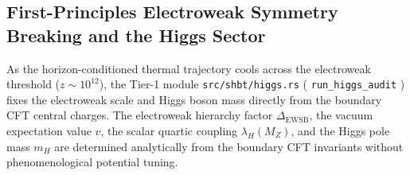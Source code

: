 \documentclass[11pt,letterpaper]{article}
\theoremstyle{plain}
\DeclareRobustCommand{\pyvar}[1]{%
  \ifmmode\text{\nolinkurl{#1}}\else\nolinkurl{#1}\fi%
}
\begin{document}
\begin{table}[htbp]
\centering
\small
{}
\caption{Continuous 5-epoch observer-frame early-universe thermal ladder from the Planck/GUT boundary ($M_{\mathrm{GUT}} = 1.2209\times10^{16}$~GeV) to BBN ($T_{\mathrm{BBN}} = 65.0$~keV). Horizon capacity $N_{\mathrm{local}}(z) = N_{\mathrm{sat}} f_H^2(z)$ scales monotonically with cosmological expansion. The primordial asymmetry $\eta_{B-L}^{\mathrm{prim}} = 1.8198\times10^{-9}$ at $M_N$ locks through the sphaleron conversion factor $C_{\mathrm{sph}} = 28/79$ to the canonical invariant $\eta_B = 6.449923\times10^{-10}$ for all $T \le T_{\mathrm{EW}}$, protected against thermal washout by $\Gamma_{\mathrm{washout}}/H \le 2.877\times10^{-15}$.}
\label{tab:observer-thermal-ladder}
\end{table}


\subsection{First-Principles Electroweak Symmetry Breaking and the Higgs Sector}
\label{sec:first-principles-ewsb-higgs}

As the horizon-conditioned thermal trajectory cools across the electroweak threshold ($z \sim 10^{12}$), the Tier-1 module \pyvar{src/shbt/higgs.rs} (\pyvar{run_higgs_audit}) fixes the electroweak scale and Higgs boson mass directly from the boundary CFT central charges.
The electroweak hierarchy factor $\Delta_{\mathrm{EWSB}}$, the vacuum expectation value $v$, the scalar quartic coupling $\lambda_H(M_Z)$, and the Higgs pole mass $m_H$ are determined analytically from the boundary CFT invariants without phenomenological potential tuning.
\end{document}
